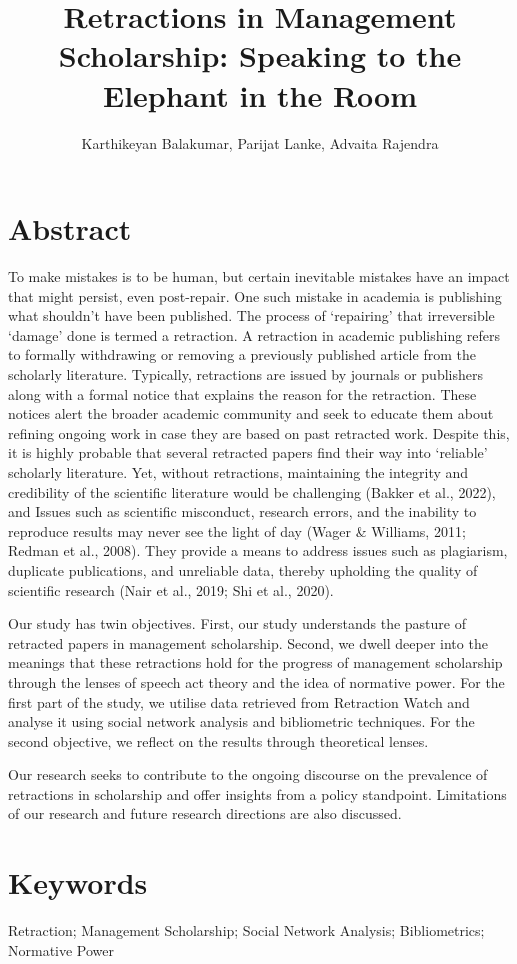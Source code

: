 \documentclass[11pt]{article}
\title{Retractions in Management Scholarship: Speaking to the Elephant in the Room}
\author{Karthikeyan Balakumar, Parijat Lanke, Advaita Rajendra}
\date{}
\begin{document}
	
	\maketitle
	
\section*{Abstract}
		To make mistakes is to be human, but certain inevitable mistakes have an impact that might persist, even post-repair. One such mistake in academia is publishing what shouldn’t have been published. The process of ‘repairing’ that irreversible ‘damage’ done is termed a retraction. A retraction in academic publishing refers to formally withdrawing or removing a previously published article from the scholarly literature. Typically, retractions are issued by journals or publishers along with a formal notice that explains the reason for the retraction. These notices alert the broader academic community and seek to educate them about refining ongoing work in case they are based on past retracted work. Despite this, it is highly probable that several retracted papers find their way into ‘reliable’ scholarly literature. Yet, without retractions, maintaining the integrity and credibility of the scientific literature would be challenging (Bakker et al., 2022), and Issues such as scientific misconduct, research errors, and the inability to reproduce results may never see the light of day (Wager \& Williams, 2011; Redman et al., 2008). They provide a means to address issues such as plagiarism, duplicate publications, and unreliable data, thereby upholding the quality of scientific research (Nair et al., 2019; Shi et al., 2020).
		
		Our study has twin objectives. First, our study understands the pasture of retracted papers in management scholarship. Second, we dwell deeper into the meanings that these retractions hold for the progress of management scholarship through the lenses of speech act theory and the idea of normative power. For the first part of the study, we utilise data retrieved from Retraction Watch and analyse it using social network analysis and bibliometric techniques. For the second objective, we reflect on the results through theoretical lenses. 
		
		Our research seeks to contribute to the ongoing discourse on the prevalence of retractions in scholarship and offer insights from a policy standpoint. Limitations of our research and future research directions are also discussed.
	
	
\section*{Keywords}
	Retraction; Management Scholarship; Social Network Analysis; Bibliometrics; Normative Power

	
\end{document}
